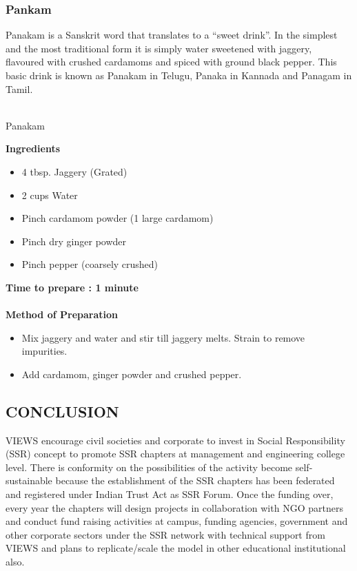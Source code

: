 \documentclass[12pt]{article}
\newcommand{\img}[2]{\scalebox{#1}{\texttt{[image: \#2]}}}
\begin{document}
	\subsubsection{Pankam}
	\par Panakam is a Sanskrit word that translates to a “sweet drink”. In the simplest and the most traditional form it is simply water sweetened with jaggery, flavoured with crushed cardamoms and spiced with ground black pepper. This basic drink is known as Panakam in Telugu, Panaka in Kannada and Panagam in Tamil.

	\begin{center}
		\img{.25}{Food/panakam.jpg} \\ Panakam
	\end{center}

	\noindent \textbf{Ingredients}
	\begin{itemize}
		\item 4 tbsp. Jaggery (Grated)
		\item 2 cups Water
		\item Pinch cardamom powder (1 large cardamom)
		\item Pinch dry ginger powder
		\item Pinch pepper (coarsely crushed)
	\end{itemize}

	\noindent \vspace{1em} \textbf{Time to prepare : 1 minute} \\ ~ \\
	\textbf{Method of Preparation}
	\begin{itemize}
		\item  Mix jaggery and water and stir till jaggery melts. Strain to remove impurities.
		\item  Add cardamom, ginger powder and crushed pepper.
	\end{itemize} \newpage

	\begin{center}
		\section*{CONCLUSION}
	\end{center} 
	\par VIEWS encourage civil societies and corporate to invest in Social Responsibility (SSR) concept to promote SSR chapters at management and engineering college level.
	There is conformity on the possibilities of the activity become self-sustainable because the establishment of the SSR chapters has been federated and registered under Indian Trust Act as SSR Forum.
	Once the funding over, every year the chapters will design projects in collaboration with NGO partners and conduct fund raising activities at campus, funding agencies, government and other corporate sectors under the SSR network with technical support from VIEWS and plans to replicate/scale the model in other educational institutional also. \\
\end{document}
